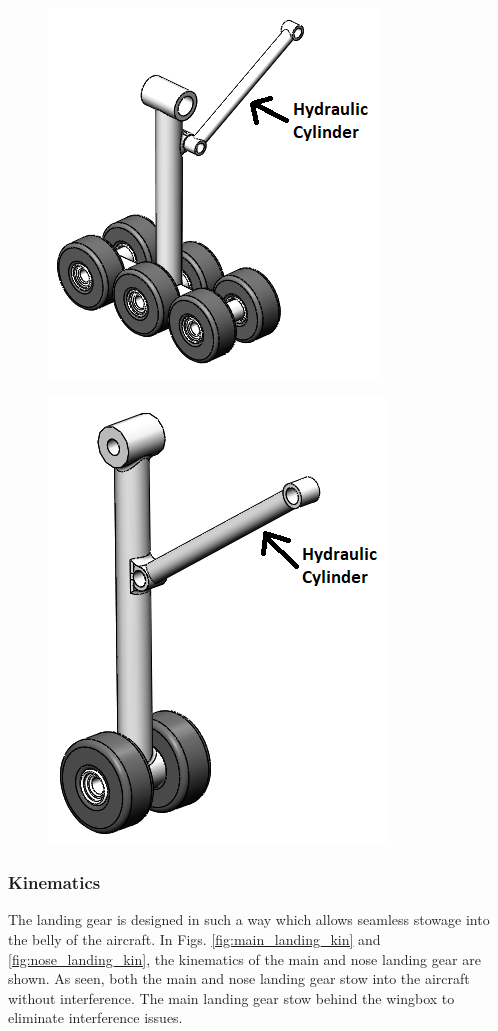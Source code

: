 \begin{figure}[!h]
  \centering
  \includegraphics[width=.5\linewidth]{Photos/landinggear/Main Gear ISO.PNG}
  \label{fig:main_gear}
\end{figure}
\begin{figure}[!h]
  \centering
  \includegraphics[width=.4\linewidth]{Photos/landinggear/Nose Gear ISO.PNG}
  \label{fig:nose_gear}
\end{figure}
\FloatBarrier

\subsubsection{Kinematics}
The landing gear is designed in such a way which allows seamless stowage into the belly of the aircraft. In Figs. \ref{fig:main_landing_kin} and \ref{fig:nose_landing_kin}, the kinematics of the main and nose landing gear are shown. As seen, both the main and nose landing gear stow into the aircraft without interference. The main landing gear stow behind the wingbox to eliminate interference issues.

